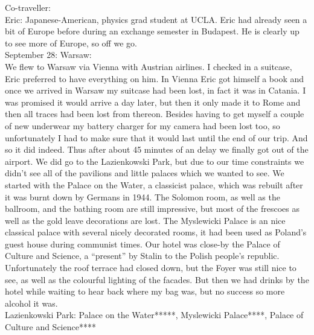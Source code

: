 Co-traveller:\\
Eric: Japanese-American, physics grad student at UCLA. Eric had already seen a bit of Europe before during an exchange semester in Budapest. He is clearly up to see more of Europe, so off we go.\\

September 28: Warsaw:\\
We flew to Warsaw via Vienna with Austrian airlines. I checked in a suitcase, Eric preferred to have everything on him. In Vienna Eric got himself a book and once we arrived in Warsaw my suitcase had been lost, in fact it was in Catania. I was promised it would arrive a day later, but then it only made it to Rome and then all traces had been lost from thereon. Besides having to get myself a couple of new underwear my battery charger for my camera had been lost too, so unfortunately I had to make sure that it would last until the end of our trip. And so it did indeed. Thus after about 45 minutes of an delay we finally got out of the airport. We did go to the Lazienkowski Park, but due to our time constraints we didn't see all of the pavilions and little palaces which we wanted to see. We started with the Palace on the Water, a classicist palace, which was rebuilt after it was burnt down by Germans in 1944. The Solomon room, as well as the ballroom, and the bathing room are still impressive, but most of the frescoes as well as the gold leave decorations are lost. The Myslewicki Palace is an nice classical palace with several nicely decorated rooms, it had been used as Poland's guest house during communist times. Our hotel was close-by the Palace of Culture and Science, a ``present'' by Stalin to the Polish people's republic. Unfortunately the roof terrace had closed down, but the Foyer was still nice to see, as well as the colourful lighting of the facades. But then we had drinks by the hotel while waiting to hear back where my bag was, but no success so more alcohol it was.\\

Lazienkowski Park: Palace on the Water*****, Myslewicki Palace****, Palace of Culture and Science****\\

